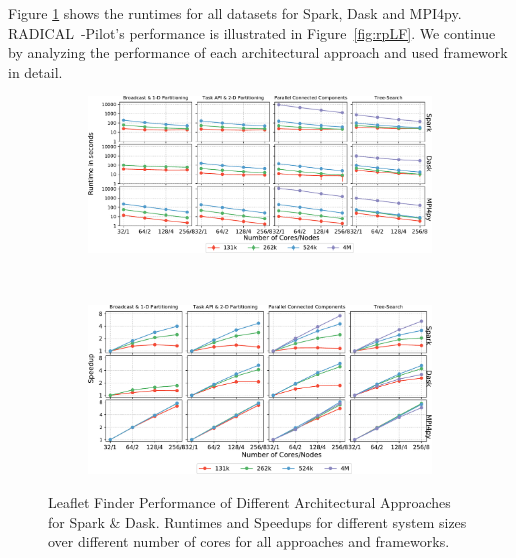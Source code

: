 Figure \ref{fig:All4approachesNoRp} shows the runtimes for all datasets for Spark, Dask and MPI4py.
RADICAL~-Pilot's performance is illustrated in Figure~\ref{fig:rpLF}.
We continue by analyzing the performance of each architectural approach and used framework in detail.

\begin{figure}[t]
    \begin{subfigure}{.95\textwidth}
        \centering
        \includegraphics[width=1\linewidth]{figures/data_analytics_hpc/task_par/All4approachesWith4M_logscaleline.pdf}
    \end{subfigure}\\
    \begin{subfigure}{.95\textwidth}
        \centering
        \includegraphics[width=.95\linewidth]{figures/data_analytics_hpc/task_par/All4approachesWith4MSpeedup.pdf}
    \end{subfigure}
    \caption{Leaflet Finder Performance of Different Architectural Approaches for Spark \& Dask.
            Runtimes and Speedups for different system sizes over different number of cores for all approaches and frameworks.}
    \label{fig:All4approachesNoRp}
\end{figure}


